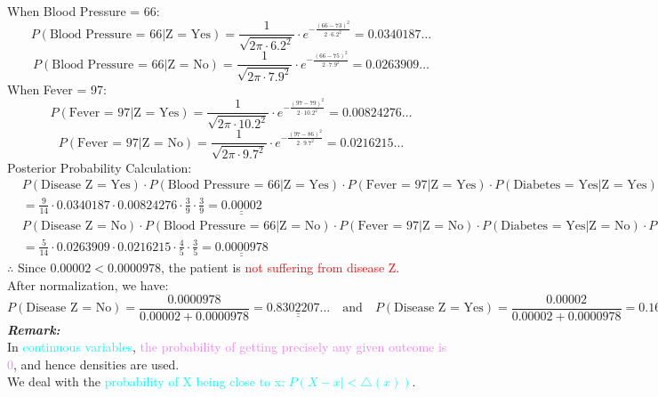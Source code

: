 \documentclass{book}
\begin{document}
When Blood Pressure = 66:\\
\[
    P(\text{Blood Pressure = 66}|\text{Z = Yes}) = \frac{1}{\sqrt{2\pi \cdot 6.2^2}} \cdot e^{-\frac{(66-73)^2}{2 \cdot 6.2^2}} = 0.0340187\ldots
\]
\[
    P(\text{Blood Pressure = 66}|\text{Z = No}) = \frac{1}{\sqrt{2\pi \cdot 7.9^2}} \cdot e^{-\frac{(66-75)^2}{2 \cdot 7.9^2}} = 0.0263909\ldots
\]
When Fever = 97:\\
\[
    P(\text{Fever = 97}|\text{Z = Yes}) = \frac{1}{\sqrt{2\pi \cdot 10.2^2}} \cdot e^{-\frac{(97-79)^2}{2 \cdot 10.2^2}} = 0.00824276\ldots
\]
\[
    P(\text{Fever = 97}|\text{Z = No}) = \frac{1}{\sqrt{2\pi \cdot 9.7^2}} \cdot e^{-\frac{(97-86)^2}{2 \cdot 9.7^2}} = 0.0216215\ldots
\]
Posterior Probability Calculation:\\
\begin{align*}
    & P(\text{Disease Z = Yes}) \cdot P(\text{Blood Pressure = 66}|\text{Z = Yes}) \cdot P(\text{Fever = 97}|\text{Z = Yes}) \cdot P(\text{Diabetes = Yes}|\text{Z = Yes}) \cdot P(\text{Vomit = Yes}|\text{Z = Yes}) \\
    & = \frac{9}{14} \cdot 0.0340187 \cdot 0.00824276 \cdot \frac{3}{9} \cdot \frac{3}{9} = \underline{\underline{0.00002}}
\end{align*}
\begin{align*}
    & P(\text{Disease Z = No}) \cdot P(\text{Blood Pressure = 66}|\text{Z = No}) \cdot P(\text{Fever = 97}|\text{Z = No}) \cdot P(\text{Diabetes = Yes}|\text{Z = No}) \cdot P(\text{Vomit = Yes}|\text{Z = No}) \\
    & = \frac{5}{14} \cdot 0.0263909 \cdot 0.0216215 \cdot \frac{4}{5} \cdot \frac{3}{5} = \underline{\underline{0.0000978}}
\end{align*}
$\therefore$ Since \(0.00002 < 0.0000978\), the patient is \textcolor{red}{not suffering from disease Z}.\\
After normalization, we have:
\[
    P(\text{Disease Z = No}) = \frac{0.0000978}{0.00002 + 0.0000978} = \underline{\underline{0.8302207\ldots}} \quad \text{and} \quad P(\text{Disease Z = Yes}) = \frac{0.00002}{0.00002 + 0.0000978} = \underline{\underline{0.1697793\ldots}}
\]
\newpage
\textbf{\large{\textit{Remark:}}}\\
In \textcolor{cyan}{continuous variables}, \textcolor{violet}{the probability of getting precisely any given outcome is 0}, and hence densities are used.\\
We deal with the \textcolor{cyan}{probability of X being close to x: \(P(X - x | < \triangle(x))\)}.\\
\end{document}
